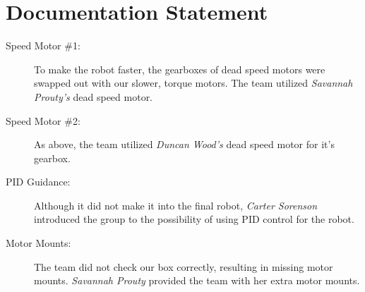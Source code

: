 \documentclass[11pt]{report}
\begin{document}



\singlespacing
\tableofcontents
\listoffigures
\lstlistoflistings
\listoftables
{} %

\newpage
\onehalfspacing












\singlespacing
{} %
\printglossary[type=\acronymtype]

\appendix

\section*{Documentation Statement}
\begin{description}
    \item[Speed Motor \#1:] To make the robot faster, the gearboxes of dead speed motors were swapped out with our slower, torque motors. The team utilized \emph{Savannah Prouty's} dead speed motor.
    \item[Speed Motor \#2:] As above, the team utilized \emph{Duncan Wood's} dead speed motor for it's gearbox.
    \item[\gls{PID} Guidance:] Although it did not make it into the final robot, \emph{Carter Sorenson} introduced the group to the possibility of using \gls{PID} control for the robot.
    \item[Motor Mounts:] The team did not check our box correctly, resulting in missing motor mounts. \emph{Savannah Prouty} provided the team with her extra motor mounts.
\end{description}




\end{document}
